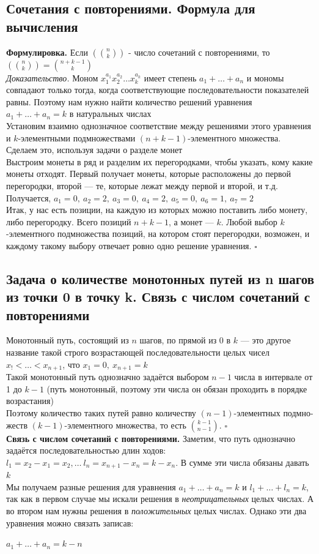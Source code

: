 \documentclass[a4paper]{article}
\newcommand{\qed}{\hfill$\square$}
\begin{document}
\subsection{Сочетания с повторениями. Формула для вычисления}
\textbf{Формулировка.} Если $\left(\binom{n}{k}\right)$ - число сочетаний с повторениями, то $\left(\binom{n}{k}\right)=\binom{n+k-1}{k}$\\[2mm]
\textit{Доказательство.} Моном $x_1^{a_1}x_2^{a_2}\ldots x_k^{a_k}$ имеет степень $a_1+\ldots+a_n$ и мономы совпадают только тогда, когда соответствующие последовательности показателей равны. Поэтому нам нужно найти количество решений уравнения $a_1+\ldots+a_n=k$ в натуральных числах\\[2mm]
\indent Установим взаимно однозначное соответствие между решениями этого уравнения и $k$-элементными подмножествами $(n+k-1)$-элементного множества. Сделаем это, используя задачи о разделе монет\\[2mm]
\indent Выстроим монеты в ряд и разделим их перегородками, чтобы указать, кому какие монеты отходят. Первый получает монеты, которые расположены до первой перегородки, второй — те, которые лежат между первой и второй, и т.д. Получается, $a_1=0,\ a_2 =2,\ a_3 =0,\ a_4 =2,\ a_5 =0,\ a_6 =1,\ a_7 =2$\\[2mm]
\indent Итак, у нас есть позиции, на каждую из которых можно поставить либо монету, либо перегородку. Всего позиций $n+k-1$, а монет — $k$. Любой выбор $k$-элементного подмножества позиций, на котором стоят перегородки, возможен, и каждому такому выбору отвечает ровно одно решение уравнения. \qed
\subsection{Задача о количестве монотонных путей из n шагов из точки 0 в точку k. Связь с числом сочетаний с повторениями}
Монотонный путь, состоящий из $n$ шагов, по прямой из 0 в $k$ — это другое название такой строго возрастающей последовательности целых чисел $x_!<\ldots<x_{n+1}$, что $x_1=0,\ x_{n+1}=k$\\[2mm]
\indent Такой монотонный путь однозначно задаётся выбором $n-1$ числа в интервале от 1 до $k-1$ (путь монотонный, поэтому эти числа он обязан проходить в порядке возрастания)\\[2mm]
\indent Поэтому количество таких путей равно количеству $(n-1)$-элементных подмно- жеств $(k-1)$-элементного множества, то есть $\binom{k-1}{n-1}$. \qed\\[2mm]
\textbf{Связь с числом сочетаний с повторениями.} Заметим, что путь однозначно задаётся последовательностью длин ходов: $l_1=x_2-x_1=x_2,\ldots\ l_n=x_{n+1}-x_n=k-x_n$. В сумме эти числа обязаны давать $k$\\[2mm]
\indent Мы получаем разные решения для уравнения $a_1+\ldots+a_n=k$ и $l_1+\ldots+l_n=k$, так как в первом случае мы искали решения в \textit{неотрицательных} целых числах. А во втором нам нужны решения в \textit{положительных} целых числах. Однако эти два уравнения можно связать записав:\\[2mm]
\centerline{$a_1+\ldots+a_n=k-n$}
\end{document}
